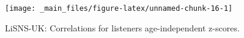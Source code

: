 \documentclass[a4paper, twoside]{templates/ociamthesis}
\newcommand*{\bibtitle}{Works Cited}
\begin{document}
\begin{figure}

{\centering \texttt{[image: \_main\_files/figure-latex/unnamed-chunk-16-1]} 

}

\caption{LiSNS-UK: Correlations for listeners age-independent z-scores.}\label{fig:unnamed-chunk-16}
\end{figure}




\setlength{\baselineskip}{0pt} %

{\renewcommand*\MakeUppercase[1]{#1}%
\printbibliography[heading=bibintoc,title={\bibtitle}]}
\end{document}
